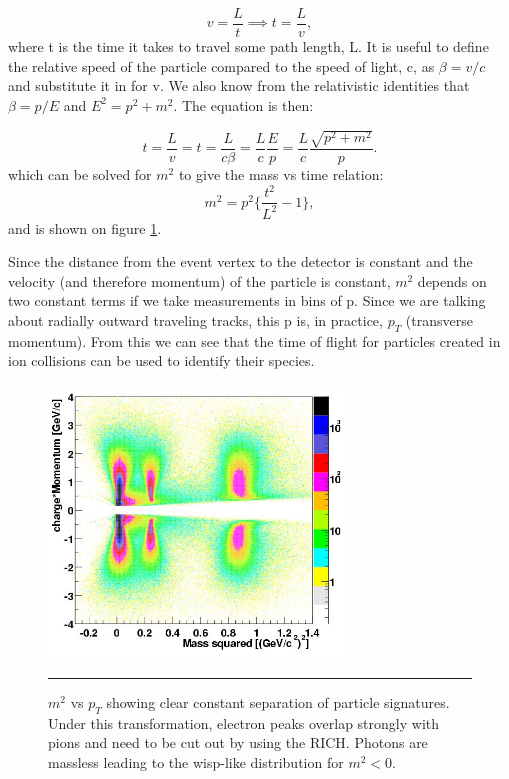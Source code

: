 \begin{equation}
v=\frac{L}{t} \implies t=\frac{L}{v},
\end{equation}
where t is the time it takes to travel some path length, L. It is useful to define the relative speed of the particle compared to the speed of light, c, as $\beta = v/c$ and substitute it in for v. We also know from the relativistic identities that $\beta = p/E$ and $E^{2} = p^{2} + m^{2}$. The equation is then: 

\begin{equation} \label{eqn:qmomentum}
t=\frac{L}{v} = t=\frac{L}{c\beta} = \frac{L}{c} \frac{E}{p} = \frac{L}{c} \frac{\sqrt{p^{2} + m^{2}}}{p}.
\end{equation}
which can be solved for $m^{2}$ to give the mass vs time relation:
\begin{equation} \label{eqn:m2tof}
m^{2} = p^{2} \bigg\{ \frac{t^{2}}{L^{2}} -1 \bigg\},
\end{equation}
and is shown on figure \ref{fig:m2tofvspt}.

Since the distance from the event vertex to the detector is constant and the velocity (and therefore momentum) of the particle is constant, $m^{2}$ depends on two constant terms if we take measurements in bins of p. Since we are talking about radially outward traveling tracks, this p is, in practice, $p_{T}$ (transverse momentum). From this we can see that the time of flight for particles created in ion collisions can be used to identify their species.
\begin{figure}[htbp!]
  \centering
    \includegraphics[width=0.7\textwidth]{Figures/m2tofvspt.jpg}
    \rule{35em}{0.5pt}
  \caption[$m^{2}$ vs $p_{T}$ showing clear constant separation of particle signatures.]{$m^{2}$ vs $p_{T}$ showing clear constant separation of particle signatures\citep{tofchargemom}. Under this transformation, electron peaks overlap strongly with pions and need to be cut out by using the RICH. Photons are massless leading to the wisp-like distribution for $m^2<0$.}
  \label{fig:m2tofvspt}
\end{figure}

\pagebreak
\pagebreak
